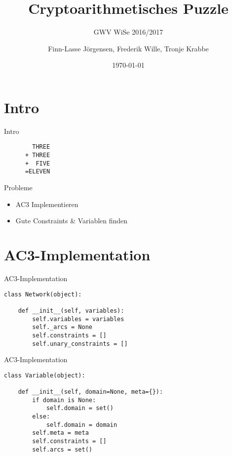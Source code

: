 \documentclass[10pt]{beamer}
\title{Cryptoarithmetisches Puzzle}
\subtitle{GWV WiSe 2016/2017}
\date{\today}
\date{}
\author{Finn-Lasse Jörgensen, Frederik Wille, Tronje Krabbe}
\institute{UHH}
\begin{document}
\maketitle


\section{Intro}

\begin{frame}[fragile]{Intro}

\begin{BVerbatim}
        THREE
      + THREE
      +  FIVE
      =ELEVEN
\end{BVerbatim}

\end{frame}

\begin{frame}[fragile]{Probleme}
    \begin{itemize}
        \item AC3 Implementieren
        \item Gute Constraints \& Variablen finden
    \end{itemize}
\end{frame}

\section{AC3-Implementation}

\begin{frame}[fragile]{AC3-Implementation}
    \begin{verbatim}
class Network(object):

    def __init__(self, variables):
        self.variables = variables
        self._arcs = None
        self.constraints = []
        self.unary_constraints = []
    \end{verbatim}
\end{frame}

\begin{frame}[fragile]{AC3-Implementation}
    \begin{verbatim}
class Variable(object):

    def __init__(self, domain=None, meta={}):
        if domain is None:
            self.domain = set()
        else:
            self.domain = domain
        self.meta = meta
        self.constraints = []
        self.arcs = set()
    \end{verbatim}
\end{frame}
\end{document}

